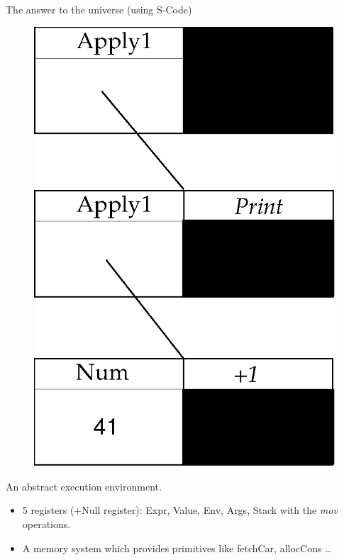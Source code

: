 \documentclass{beamer}
\begin{document}
\begin{frame}{The answer to the universe (using S-Code)}
\begin{figure}[h]
\center
\includegraphics[scale=0.5]{answerscode.eps}
\end{figure}
\end{frame}

\begin{frame}{An abstract execution environment.}
\begin{itemize}
\item 5 registers (+Null register): Expr, Value, Env, Args, Stack with the
\emph{mov}
operations.
\item A memory system which provides primitives like fetchCar, allocCons \dots 
\end{itemize}
\end{frame}
\end{document}

